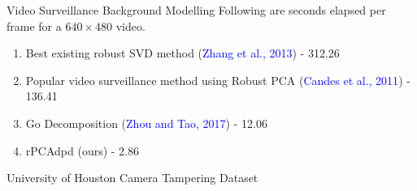 \documentclass[10pt]{beamer}
\begin{document}
\begin{frame}{Video Surveillance Background Modelling}
    Following are seconds elapsed per frame for a $640 \times 480$ video.
    \begin{enumerate}
        \item Best existing robust SVD method (\textcolor{blue}{Zhang et al., 2013}) - 312.26
        \item Popular video surveillance method using Robust PCA (\textcolor{blue}{Candes et al., 2011}) - 136.41
        \item Go Decomposition (\textcolor{blue}{Zhou and Tao, 2017}) - 12.06
        \item rPCAdpd (ours) - 2.86
    \end{enumerate}
\end{frame}

\begin{frame}{University of Houston Camera Tampering Dataset}
    \begin{columns}
\end{columns}
\end{frame}
\end{document}
